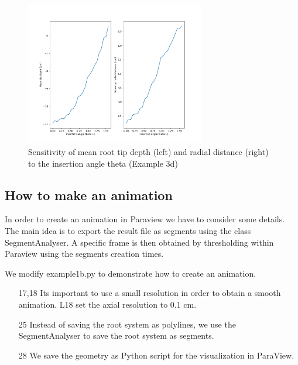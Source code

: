 \documentclass[a4paper]{article}
\begin{document}
\begin{figure}
\centering
\includegraphics[width=0.7\textwidth]{example_4b.png}
\caption{Sensitivity of mean root tip depth (left) and radial distance (right) to the insertion angle theta (Example 3d) } \label{fig:sa}
\end{figure}

\subsection{How to make an animation}

In order to create an animation in Paraview we have to consider some details. The main idea is to export the result file as segments using the class SegmentAnalyser. A specific frame is then obtained by thresholding within Paraview using the segments creation times. 

We modify example1b.py to demonstrate how to create an animation.

 

\begin{itemize}

\item[17,18] Its important to use a small resolution in order to obtain a smooth animation. L18 set the axial resolution to 0.1 cm. 

\item[25] Instead of saving the root system as polylines, we use the SegmentAnalyser to save the root system as segments.

\item[28] We save the geometry as Python script for the visualization in ParaView.

\end{itemize}
\end{document}
